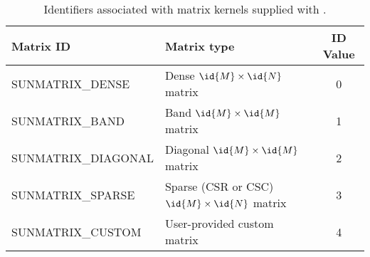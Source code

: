 \begin{table}
\centering
\caption{Identifiers associated with matrix kernels supplied with {\sundials}.}
\label{t:matrixIDs}
\medskip
\begin{tabular}{|l|l|c|}
\hline
{\bf Matrix ID} & {\bf Matrix type} & {\bf ID Value} \\
\hline
SUNMATRIX\_DENSE      & Dense $\id{M} \times \id{N}$ matrix               & 0 \\ 
SUNMATRIX\_BAND       & Band $\id{M} \times \id{M}$ matrix                & 1 \\
SUNMATRIX\_DIAGONAL   & Diagonal $\id{M} \times \id{M}$ matrix            & 2 \\
SUNMATRIX\_SPARSE     & Sparse (CSR or CSC) $\id{M} \times \id{N}$ matrix & 3 \\ 
SUNMATRIX\_CUSTOM     & User-provided custom matrix                       & 4 \\
\hline
\end{tabular}
\end{table}


\newlength{\ColOne}
\newlength{\ColTwo}
\setlength{\ColTwo}{\textwidth}
\addtolength{\ColTwo}{-0.5in}
\addtolength{\ColTwo}{-\ColOne}

